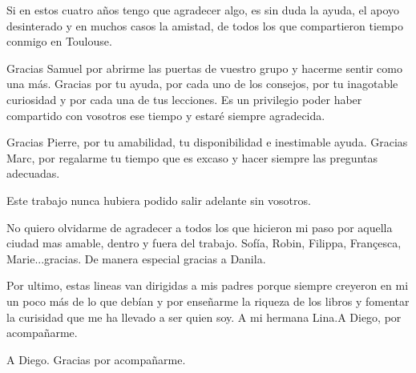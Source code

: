 \starbreak

Si en estos cuatro años tengo que agradecer algo, es sin duda la ayuda, el apoyo desinterado y en muchos casos la amistad, de todos los que compartieron tiempo conmigo en Toulouse.

Gracias Samuel por abrirme las puertas de vuestro grupo y hacerme sentir como una más. Gracias por tu ayuda, por cada uno de los consejos, por tu inagotable curiosidad y por cada una de tus lecciones. Es un privilegio poder haber compartido con vosotros ese tiempo y estaré siempre agradecida.

Gracias Pierre, por tu amabilidad, tu disponibilidad e inestimable ayuda. Gracias Marc, por regalarme tu tiempo que es excaso y hacer siempre las preguntas adecuadas.

Este trabajo nunca hubiera podido salir adelante sin vosotros.

No quiero olvidarme de agradecer a todos los que hicieron mi paso por aquella ciudad mas amable, dentro y fuera del trabajo. Sofía, Robin, Filippa, Françesca, Marie...gracias. De manera especial gracias a Danila. 

\starbreak

Por ultimo, estas lineas van dirigidas a mis padres porque siempre creyeron en mi un poco más de lo que debían y por enseñarme la riqueza de los libros y fomentar la curisidad que me ha llevado a ser quien soy. A mi hermana Lina.A Diego, por acompañarme.


\starbreak

A Diego. Gracias por acompañarme. 


